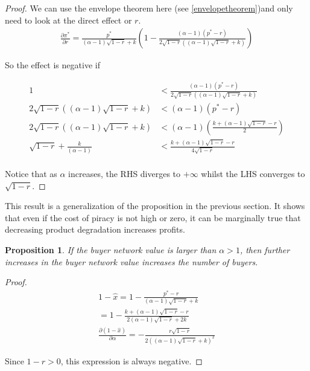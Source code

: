 \documentclass[12pt]{report}
\newtheorem{proposition}{Proposition}
\numberwithin{equation}{section}
\begin{document}
\begin{proof}
We can use the envelope theorem here (see \ref{envelopetheorem})and only need to look at the direct effect or $r$.
\begin{align*}
\frac{\partial \pi^* }{\partial r}
=
\frac{p^*}{(\alpha-1) \sqrt{1-r}+k} \left(1-\frac{(\alpha-1) (p^*-r)}{2 \sqrt{1-r} \left((\alpha-1) \sqrt{1-r}+k\right)}\right)
\end{align*}

So the effect is negative if 

\begin{align*}
1&<\frac{(\alpha-1) (p^*-r)}{2 \sqrt{1-r} \left((\alpha-1) \sqrt{1-r}+k\right)} \\
2 \sqrt{1-r} \left((\alpha-1) \sqrt{1-r}+k\right) &<(\alpha-1) (p^*-r) \\
2 \sqrt{1-r} \left((\alpha-1) \sqrt{1-r}+k\right) &<(\alpha-1) \left(\frac{k+ (\alpha-1)\sqrt{ 1 -r }-r}{2} \right) \\
\sqrt{1-r}+ \frac{k}{(\alpha-1) }  &< \frac{k+ (\alpha-1)\sqrt{ 1 -r }-r}{4 \sqrt{1-r} } \\
\end{align*}

Notice that as $\alpha$ increases, the RHS diverges to $+\infty$ whilst the LHS converges to $\sqrt{1-r}$.  
\end{proof}

This result is a generalization of the proposition in the previous section. It shows that even if the cost of piracy is not high or zero, it can be marginally true that decreasing product degradation increases profits. 

\begin{proposition}
If the buyer network value is larger than $\alpha>1$, then further increases in the buyer network value increases the number of buyers. 
\end{proposition}

\begin{proof}
\begin{align*}
1 - \hat{x}= 1 - \frac{p^*-r}{(\alpha - 1) \sqrt{1-r} +k} \\
= 1 - \frac{k+ (\alpha-1)\sqrt{ 1 -r }-r}{2(\alpha - 1) \sqrt{1-r} +2k} \\
\frac{\partial (1 - \hat{x})}{\partial \alpha}
=-\frac{ r\sqrt{1-r} }{2 \left((\alpha-1) \sqrt{1-r}+k\right)^2} 
\end{align*}

Since $1-r>0$, this expression is always negative. 

\end{proof}
\end{document}
